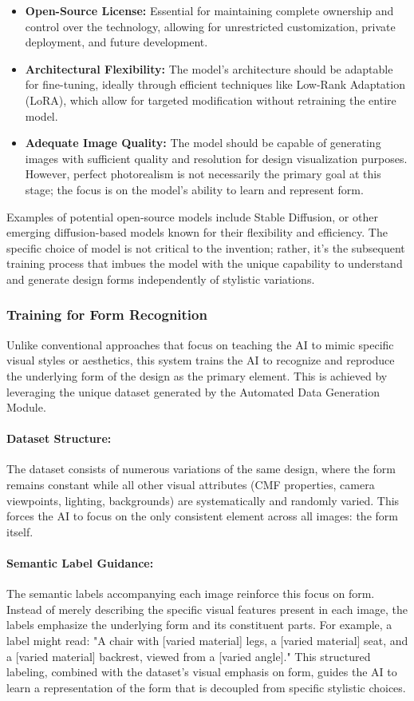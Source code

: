 \documentclass{article}
\begin{document}
\begin{itemize}
    \item \textbf{Open-Source License:} Essential for maintaining complete ownership and control over the technology, allowing for unrestricted customization, private deployment, and future development.
    \item \textbf{Architectural Flexibility:} The model's architecture should be adaptable for fine-tuning, ideally through efficient techniques like Low-Rank Adaptation (LoRA), which allow for targeted modification without retraining the entire model.
    \item \textbf{Adequate Image Quality:} The model should be capable of generating images with sufficient quality and resolution for design visualization purposes. However, perfect photorealism is not necessarily the primary goal at this stage; the focus is on the model's ability to learn and represent form.
\end{itemize}

Examples of potential open-source models include Stable Diffusion, or other emerging diffusion-based models known for their flexibility and efficiency. The specific choice of model is not critical to the invention; rather, it's the subsequent training process that imbues the model with the unique capability to understand and generate design forms independently of stylistic variations.

\subsubsection{Training for Form Recognition}
Unlike conventional approaches that focus on teaching the AI to mimic specific visual styles or aesthetics, this system trains the AI to recognize and reproduce the underlying form of the design as the primary element. This is achieved by leveraging the unique dataset generated by the Automated Data Generation Module.

\paragraph{Dataset Structure:} The dataset consists of numerous variations of the same design, where the form remains constant while all other visual attributes (CMF properties, camera viewpoints, lighting, backgrounds) are systematically and randomly varied. This forces the AI to focus on the only consistent element across all images: the form itself.

\paragraph{Semantic Label Guidance:} The semantic labels accompanying each image reinforce this focus on form. Instead of merely describing the specific visual features present in each image, the labels emphasize the underlying form and its constituent parts. For example, a label might read: "A chair with [varied material] legs, a [varied material] seat, and a [varied material] backrest, viewed from a [varied angle]." This structured labeling, combined with the dataset's visual emphasis on form, guides the AI to learn a representation of the form that is decoupled from specific stylistic choices.
\end{document}
